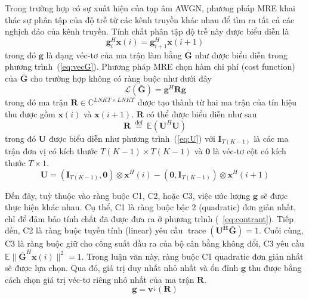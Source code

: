 Trong trường hợp có sự xuất hiện của tạp âm AWGN, phương pháp MRE khai thác sự phân tập của độ trễ từ các kênh truyền khác nhau để tìm ra tất cả các nghịch đảo của kênh truyền. Tính chất phân tập độ trễ này được biểu diễn là
\begin{equation}
\label{eq:contrant}
    \mathbf{g}_i^H \mathbf{x}(i) = \mathbf{g}_{i+1}^H \mathbf{x}(i+1)
\end{equation}
trong đó $\mathbf{g}$ là dạng véc-tơ của ma trận làm bằng $\bar{\mathbf{G}}$ như được biểu diễn trong phương trình~(\ref{eq:vecG}). Phương pháp MRE chọn hàm chi phí (cost function) của $\bar{\mathbf{G}}$ cho trường hợp không có ràng buộc như dưới đây
\begin{equation}
\label{eq:loss_mre}
    \mathcal{L}(\bar{\mathbf{G}})=\mathbf{g}^H \mathbf{R} \mathbf{g}
\end{equation}
trong đó ma trận $\mathbf{R} \in \mathbb{C}^{LNKT \times LNKT}$ được tạo thành từ hai ma trận của tín hiệu thu được gồm $\mathbf{x}(i)$ và $\mathbf{x}(i+1)$. $\mathbf{R}$ có thể được biểu diễn như sau
\begin{equation}
\label{eq:R}
\mathbf{R} \stackrel{\text { def }}{=} \mathbb{E}\left(\mathbf{U}^{H} \mathbf{U}\right)
\end{equation}
trong đó $\mathbf{U}$ được biểu diễn như phương trình~(\ref{eq:U}) với $\mathbf{I}_{T (K-1)}$ là các ma trận đơn vị có kích thước $T(K-1) \times T(K-1)$ và $\mathbf{0}$ là véc-tơ cột có kích thước $T \times 1$.
\begin{equation}
\label{eq:U}
\mathbf{U} = \left(\mathbf{I}_{T (K-1)}, \mathbf{0}\right) \otimes \mathbf{x}^{H}(i)-\left(\mathbf{0}, \mathbf{I}_{T (K-1)}\right) \otimes \mathbf{x}^{H}(i+1)
\end{equation}

Đến đây, tuỳ thuộc vào ràng buộc C1, C2, hoặc C3, việc ước lượng $\mathbf{g}$ sẽ được thực hiện khác nhau. Cụ thể, C1 là ràng buộc bậc 2 (quadratic) đơn giản nhất, chỉ để đảm bảo tính chất đã được đưa ra ở phương trình (~\ref{eq:contrant}). Tiếp đến, C2 là ràng buộc tuyến tính (linear) yêu cầu $\operatorname{trace}(\mathbf{U^H \mathbf{\bar{G}}}) = 1$. Cuối cùng, C3 là ràng buộc giữ cho công suất đầu ra của bộ cân bằng không đổi, C3 yêu cầu $\mathbb{E}\| \mathbf{\bar{G}}^H \mathbf{x}(i) \|^2 = 1$. Trong luận văn này, ràng buộc C1 quadratic đơn giản nhất sẽ được lựa chọn. Qua đó, giá trị duy nhất nhỏ nhất và ổn đỉnh $\mathbf{g}$ thu được bằng cách chọn giá trị véc-tơ riêng nhỏ nhất của ma trận $\mathbf{R}$.
\begin{equation}
    \mathbf{g} = \mathbf{v}^{\downarrow} (\mathbf{R})
\end{equation}

